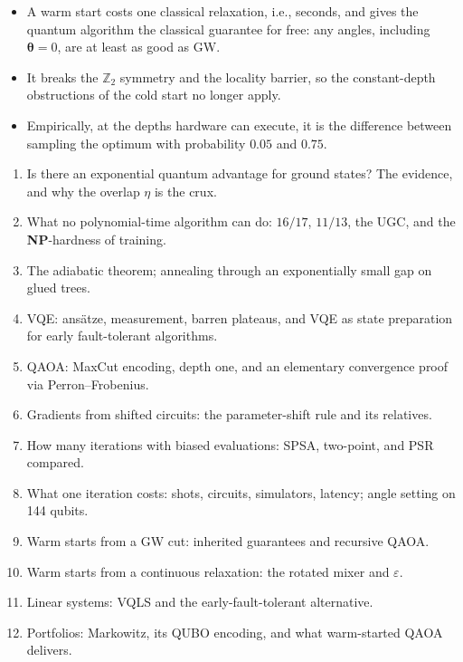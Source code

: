 \documentclass[overheadsbeamer.tex]{subfiles}
\begin{document}
\begin{frame}
\begin{itemize}\setlength\itemsep{0.4em}
    \item A warm start costs one classical relaxation, i.e., seconds, and gives the quantum algorithm the classical guarantee for free: any angles, including $\boldsymbol\theta = 0$, are at least as good as GW.
    \item It breaks the $\mathbb{Z}_2$ symmetry and the locality barrier, so the constant-depth obstructions of the cold start no longer apply.
    \item Empirically, at the depths hardware can execute, it is the difference between sampling the optimum with probability $0.05$ and $0.75$.
\end{itemize}
\end{frame}

\begin{frame}
\onp{\footnotesize}
\begin{enumerate}\setlength\itemsep{0.05em}\setcounter{enumi}{1}
    \item Is there an exponential quantum advantage for ground states? The evidence, and why the overlap $\eta$ is the crux.
    \item What no polynomial-time algorithm can do: $16/17$, $11/13$, the UGC, and the \textbf{NP}-hardness of training.
    \item The adiabatic theorem; annealing through an exponentially small gap on glued trees.
    \item VQE: ansätze, measurement, barren plateaus, and VQE as state preparation for early fault-tolerant algorithms.
    \item QAOA: MaxCut encoding, depth one, and an elementary convergence proof via Perron--Frobenius.
    \item Gradients from shifted circuits: the parameter-shift rule and its relatives.
    \item How many iterations with biased evaluations: SPSA, two-point, and PSR compared.
    \item What one iteration costs: shots, circuits, simulators, latency; angle setting on 144 qubits.
    \item Warm starts from a GW cut: inherited guarantees and recursive QAOA.
    \item Warm starts from a continuous relaxation: the rotated mixer and $\varepsilon$.
    \item Linear systems: VQLS and the early-fault-tolerant alternative.
    \item Portfolios: Markowitz, its QUBO encoding, and what warm-started QAOA delivers.
\end{enumerate}
\end{frame}

\begin{frame}[allowframebreaks]
\biblio
\end{frame}
\end{document}

